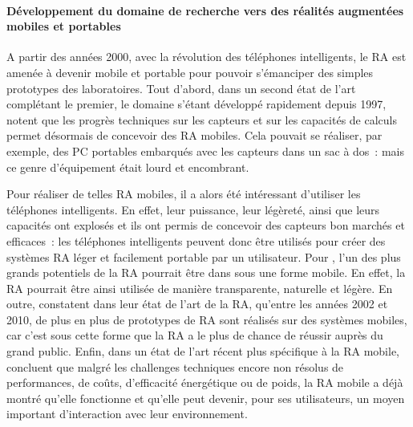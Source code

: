 
\paragraph*{Développement du domaine de recherche vers des réalités augmentées mobiles et portables}
A partir des années 2000, avec la révolution des téléphones intelligents, le RA est amenée à devenir mobile et portable pour pouvoir s'émanciper des simples prototypes des laboratoires. Tout d'abord, dans un second état de l'art complétant le premier, le domaine s'étant développé rapidement depuis 1997, \citet{AzumaBaillotBehringerEtAl2001} notent que les progrès techniques sur les capteurs et sur les capacités de calculs permet désormais de concevoir des RA mobiles. Cela pouvait se réaliser, par exemple, des PC portables embarqués avec les capteurs dans un sac à dos~: mais ce genre d'équipement était lourd et encombrant. \citep{DeSaChurchill2013}

Pour réaliser de telles RA mobiles, il a alors été intéressant d'utiliser les téléphones intelligents. En effet, leur puissance, leur légèreté, ainsi que leurs capacités ont explosés et ils ont permis de concevoir des capteurs bon marchés et efficaces~: les téléphones intelligents peuvent donc être utilisés pour créer des systèmes RA léger et facilement portable par un utilisateur. \citep{DeSaChurchill2013} Pour \citeauthor{VanKrevelenPoelman2010}, l'un des plus grands potentiels de la RA pourrait être dans sous une forme mobile. En effet, la RA pourrait être ainsi utilisée de manière transparente, naturelle et légère. En outre, \citet{CarmignianiFurhtAnisettiEtAl2011} constatent dans leur état de l'art de la RA, qu'entre les années 2002 et 2010, de plus en plus de prototypes de RA sont réalisés sur des systèmes mobiles, car c'est sous cette forme que la RA a le plus de chance de réussir auprès du grand public. Enfin, dans un état de l'art récent plus spécifique à la RA mobile, \citet{HuangHuiPeyloEtAl2013} concluent que malgré les challenges techniques encore non résolus de performances, de coûts, d'efficacité énergétique ou de poids, la RA mobile a déjà montré qu'elle fonctionne et qu'elle peut devenir, pour ses utilisateurs, un moyen important d’interaction avec leur environnement.



